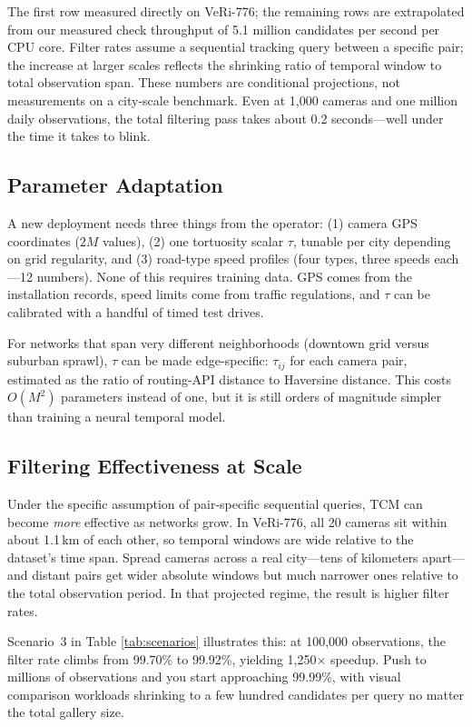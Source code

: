 \documentclass{ijitcs}
\newcommand{\rev}[1]{#1}
\begin{document}
The first row measured directly on VeRi-776; the remaining rows are extrapolated from our measured check throughput of 5.1 million candidates per second per CPU core. Filter rates assume a sequential tracking query between a specific pair; the increase at larger scales reflects the shrinking ratio of temporal window to total observation span. \rev{These numbers are conditional projections, not measurements on a city-scale benchmark.} Even at 1{,}000 cameras and one million daily observations, the total filtering pass takes about 0.2 seconds---well under the time it takes to blink.

\subsection{Parameter Adaptation}
A new deployment needs three things from the operator: (1) camera GPS coordinates ($2M$ values), (2) one tortuosity scalar $\tau$, tunable per city depending on grid regularity, and (3) road-type speed profiles (four types, three speeds each---12 numbers). None of this requires training data. GPS comes from the installation records, speed limits come from traffic regulations, and $\tau$ can be calibrated with a handful of timed test drives.

For networks that span very different neighborhoods (downtown grid versus suburban sprawl), $\tau$ can be made edge-specific: $\tau_{ij}$ for each camera pair, estimated as the ratio of routing-API distance to Haversine distance. This costs $O(M^2)$ parameters instead of one, but it is still orders of magnitude simpler than training a neural temporal model.

\subsection{Filtering Effectiveness at Scale}
\rev{Under the specific assumption of pair-specific sequential queries, TCM can become \textit{more} effective as networks grow.} In VeRi-776, all 20 cameras sit within about 1.1\,km of each other, so temporal windows are wide relative to the dataset's time span. Spread cameras across a real city---tens of kilometers apart---and distant pairs get wider absolute windows but much narrower ones relative to the total observation period. \rev{In that projected regime,} the result is higher filter rates.

Scenario~3 in Table \ref{tab:scenarios} illustrates this: at 100{,}000 observations, the filter rate climbs from 99.70\% to 99.92\%, yielding 1,250$\times$ speedup. Push to millions of observations and you start approaching 99.99\%, with visual comparison workloads shrinking to a few hundred candidates per query no matter the total gallery size.
\end{document}

